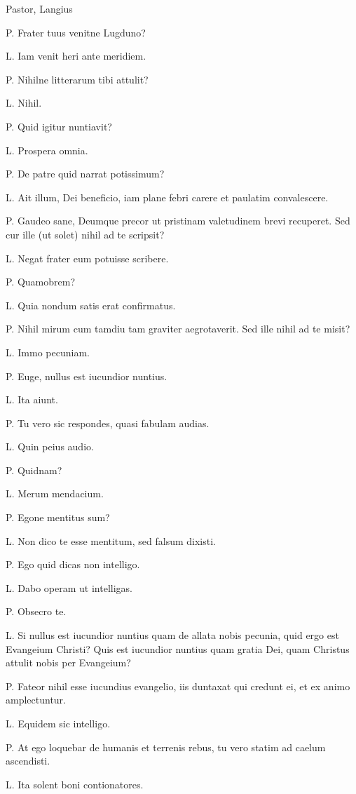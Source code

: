 \documentclass{article}
\begin{document}
Pastor, Langius

P. Frater tuus venitne Lugduno?

L. Iam venit heri ante meridiem.

P. Nihilne litterarum tibi attulit?

L. Nihil. 

P. Quid igitur nuntiavit?

L. Prospera omnia. 

P. De patre quid narrat potissimum?

L. Ait illum, Dei beneficio, iam plane febri carere et paulatim convalescere. 

P. Gaudeo sane, Deumque precor ut pristinam valetudinem brevi recuperet. Sed cur ille (ut solet) nihil ad te scripsit?

L. Negat frater eum potuisse scribere. 

P. Quamobrem?

L. Quia nondum satis erat confirmatus. 

P. Nihil mirum cum tamdiu tam graviter aegrotaverit. Sed ille nihil ad te misit?

L. Immo pecuniam. 

P. Euge, nullus est iucundior nuntius. 

L. Ita aiunt. 

P. Tu vero sic respondes, quasi fabulam audias. 

L. Quin peius audio. 

P. Quidnam?

L. Merum mendacium. 

P. Egone mentitus sum?

L. Non dico te esse mentitum, sed falsum dixisti. 

P. Ego quid dicas non intelligo. 

L. Dabo operam ut intelligas. 

P. Obsecro te. 

L. Si nullus est iucundior nuntius quam de allata nobis pecunia, quid ergo est Evangeium Christi? Quis est iucundior nuntius quam gratia Dei, quam Christus attulit nobis per Evangeium?

P. Fateor nihil esse iucundius evangelio, iis duntaxat qui credunt ei, et ex animo amplectuntur. 

L. Equidem sic intelligo. 

P. At ego loquebar de humanis et terrenis rebus, tu vero statim ad caelum ascendisti. 

L. Ita solent boni contionatores. 
\end{document}
